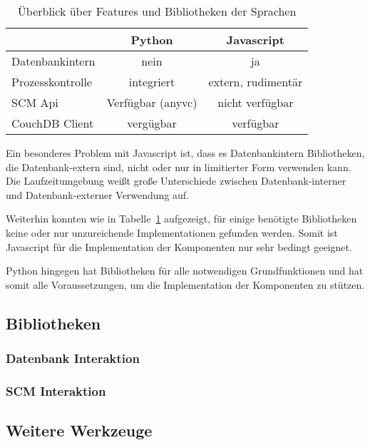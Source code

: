 \begin{table}[ht]
\centering
\begin{tabular}{l|c|c}
                            & \textbf{Python}   & \textbf{Javascript} \\
    \hline
    Datenbankintern         & nein              & ja \\
    Prozesskontrolle        & integriert        & extern, rudiment\"ar \\
    SCM Api                 & Verf\"ugbar (anyvc)& nicht verf\"ugbar \\
    CouchDB Client          & verg\"ugbar       & verf\"ugbar \\
\end{tabular}
\caption{\"Uberblick \"uber Features und Bibliotheken der Sprachen}
\label{tab:python-vs-js}
\end{table}

Ein besonderes Problem mit Javascript ist,
dass es Datenbankintern Bibliotheken, die Datenbank-extern sind,
nicht oder nur in limitierter Form verwenden kann.
Die Laufzeitumgebung weißt große Unterschiede
zwischen Datenbank-interner und Datenbank-externer Verwendung auf.

Weiterhin konnten wie in Tabelle~\ref{tab:python-vs-js} aufgezeigt,
für einige benötigte Bibliotheken keine
oder nur unzureichende Implementationen gefunden werden.
Somit ist Javascript für die Implementation der Komponenten
nur sehr bedingt geeignet.

Python hingegen hat Bibliotheken für alle notwendigen Grundfunktionen
und hat somit alle Voraussetzungen,
um die Implementation der Komponenten zu stützen.

\subsection{Bibliotheken}

\subsubsection{Datenbank Interaktion}


\subsubsection{SCM Interaktion}



\subsection{Weitere Werkzeuge}

